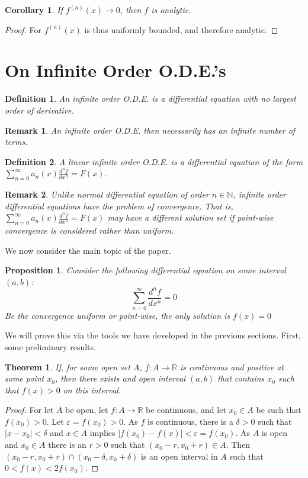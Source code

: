 \documentclass[oneside]{book}
\theoremstyle{mystyle}
\newtheorem{theorem}{Theorem}[section]
\newtheorem{definition}{Definition}[section]
\newtheorem{corollary}{Corollary}[section]
\newtheorem{proposition}{Proposition}[section]
\newtheorem{remark}{Remark}[section]
\begin{document}
\begin{corollary}
If $f^{(n)}(x)\rightarrow 0$, then $f$ is analytic.
\end{corollary}
\begin{proof}
For $f^{(n)}(x)$ is thus uniformly bounded, and therefore analytic.
\end{proof}
%
\section{On Infinite Order O.D.E.'s}
%
\begin{definition}
An infinite order O.D.E. is a differential equation with no largest order of derivative.
\end{definition}
%
\begin{remark}
An infinite order O.D.E. then necessarily has an infinite number of terms.
\end{remark}

\begin{definition}
A linear infinite order O.D.E. is a differential equation of the form $\sum_{n=0}^{\infty} a_n(x) \frac{d^n f}{dx^n} = F(x)$.
\end{definition}

\begin{remark}
Unlike normal differential equation of order $n\in \mathbb{N}$, infinite order differential equations have the problem of convergence. That is, $\sum_{n=0}^{\infty} a_n(x) \frac{d^n f}{dx^n} = F(x)$ may have a different solution set if point-wise convergence is considered rather than uniform.
\end{remark}

We now consider the main topic of the paper.

\begin{proposition}
Consider the following differential equation on some interval $(a,b)$:
\begin{equation}
\nonumber \sum_{n=0}^{\infty} \frac{d^n f}{dx^n} = 0
\end{equation}
Be the convergence uniform or point-wise, the only solution is $f(x)=0$
\end{proposition}

We will prove this via the tools we have developed in the previous sections. First, some preliminary results.

\begin{theorem}
If, for some open set $A$, $f:A\rightarrow \mathbb{R}$ is continuous and positive at some point $x_0$, then there exists and open interval $(a,b)$ that contains $x_0$ such that $f(x)>0$ on this interval.
\end{theorem}
\begin{proof}
For let $A$ be open, let $f:A\rightarrow \mathbb{R}$ be continuous, and let $x_0\in A$ be such that $f(x_0)>0$. Let $\varepsilon = f(x_0)>0$. As $f$ is continuous, there is a $\delta>0$ such that $|x-x_0|<\delta$ and $x\in A$ implies $|f(x_0)-f(x)|<\varepsilon = f(x_0)$. As $A$ is open and $x_0\in A$ there is an $r>0$ such that $(x_0-r,x_0+r)\in A$. Then $(x_0-r,x_0+r)\cap (x_0-\delta,x_0+\delta)$ is an open interval in $A$ such that $0<f(x)<2f(x_0)$.
\end{proof}
\end{document}

